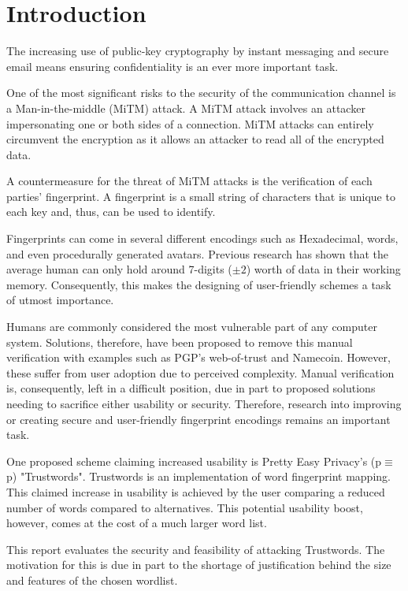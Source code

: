 \chapter{Introduction}
\label{cha:Introduction}

The increasing use of public-key cryptography by instant messaging and secure email means ensuring confidentiality is an ever more important task.

One of the most significant risks to the security of the communication channel is a Man-in-the-middle (MiTM) attack. A MiTM attack involves an attacker impersonating one or both sides of a connection. MiTM attacks can entirely circumvent the encryption as it allows an attacker to read all of the encrypted data. 

A countermeasure for the threat of MiTM attacks is the verification of each parties’ fingerprint. A fingerprint is a small string of characters that is unique to each key and, thus, can be used to identify.

Fingerprints can come in several different encodings such as Hexadecimal, words, and even procedurally generated avatars. Previous research has shown that the average human can only hold around 7-digits ($\pm 2$) worth of data in their working memory\cite{miller1956magical}. Consequently, this makes the designing of user-friendly schemes a task of utmost importance.

Humans are commonly considered the most vulnerable part of any computer system. Solutions, therefore, have been proposed to remove this manual verification with examples such as PGP's web-of-trust\cite{callas1998openpgp} and Namecoin\cite{kalodner2015empirical}. However, these suffer from user adoption due to perceived complexity. Manual verification is, consequently, left in a difficult position, due in part to proposed solutions needing to sacrifice either usability or security. Therefore, research into improving or creating secure and user-friendly fingerprint encodings remains an important task.

One proposed scheme claiming increased usability is Pretty Easy Privacy's (p$\equiv$p) "Trustwords". Trustwords is an implementation of word fingerprint mapping. This claimed increase in usability is achieved by the user comparing a reduced number of words compared to alternatives. This potential usability boost, however, comes at the cost of a much larger word list.

This report evaluates the security and feasibility of attacking Trustwords. The motivation for this is due in part to the shortage of justification behind the size and features of the chosen wordlist.

